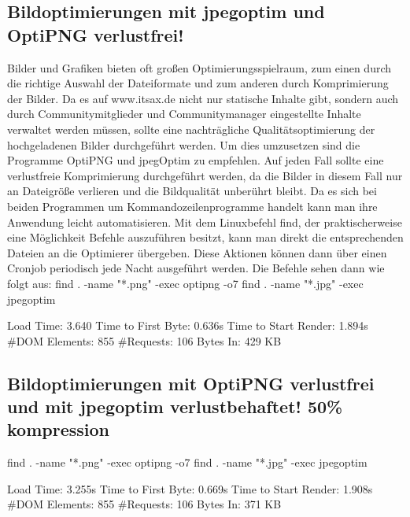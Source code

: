\subsection{Bildoptimierungen mit jpegoptim und OptiPNG verlustfrei!}
Bilder und Grafiken bieten oft großen Optimierungsspielraum, zum einen durch die richtige Auswahl der Dateiformate und zum anderen durch Komprimierung der Bilder. Da es auf www.itsax.de nicht nur statische Inhalte gibt, sondern auch durch Communitymitglieder und Communitymanager eingestellte Inhalte verwaltet werden müssen, sollte eine nachträgliche Qualitätsoptimierung der hochgeladenen Bilder durchgeführt werden. Um dies umzusetzen sind die Programme OptiPNG und jpegOptim zu empfehlen. Auf jeden Fall sollte eine verlustfreie Komprimierung durchgeführt werden, da die Bilder in diesem Fall nur an Dateigröße verlieren und die Bildqualität unberührt bleibt. Da es sich bei beiden Programmen um Kommandozeilenprogramme handelt kann man ihre Anwendung leicht automatisieren. Mit dem Linuxbefehl find, der praktischerweise eine Möglichkeit Befehle auszuführen besitzt, kann man direkt die entsprechenden Dateien an die Optimierer übergeben. Diese Aktionen können dann über einen Cronjob periodisch jede Nacht ausgeführt werden. Die Befehle sehen dann wie folgt aus: 
find . -name "*.png" -exec optipng -o7 {} \;
find . -name "*.jpg" -exec jpegoptim {} \;


Load Time: 3.640
Time to First Byte: 0.636s %
Time to Start Render: 1.894s
\#DOM Elements: 855 	
\#Requests: 106 %
Bytes In: 429 KB %
\subsection{Bildoptimierungen mit OptiPNG verlustfrei und mit jpegoptim verlustbehaftet! 50\% kompression}
find . -name "*.png" -exec optipng -o7 {} \;
find . -name "*.jpg" -exec jpegoptim {} \;

Load Time: 3.255s
Time to First Byte: 0.669s %
Time to Start Render: 1.908s
\#DOM Elements: 855 	
\#Requests: 106 %
Bytes In: 371 KB %

